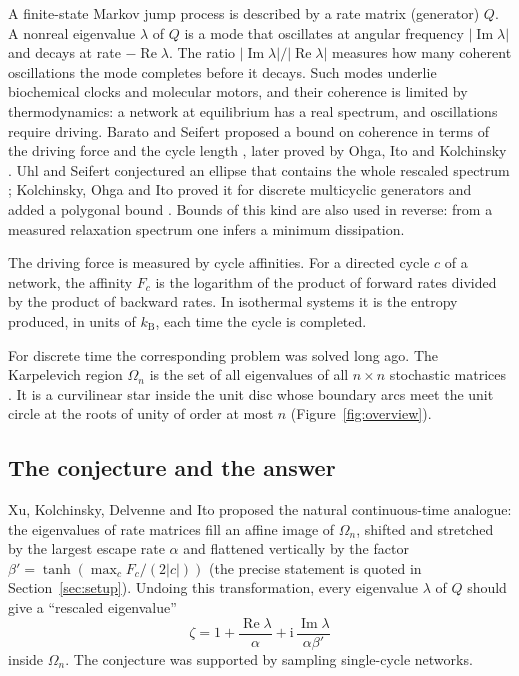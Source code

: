 \documentclass[11pt,a4paper]{article}
\numberwithin{equation}{section}
\theoremstyle{definition}
\theoremstyle{remark}
\newcommand{\ii}{\mathrm{i}}
\newcommand{\Om}{\Omega}
\begin{document}
A finite-state Markov jump process is described by a rate matrix
(generator) \(Q\). A nonreal eigenvalue \(\lambda\) of \(Q\) is a mode
that oscillates at angular frequency \(|\operatorname{Im}\lambda|\) and
decays at rate \(-\operatorname{Re}\lambda\). The ratio
\(|\operatorname{Im}\lambda|/|\operatorname{Re}\lambda|\) measures how
many coherent oscillations the mode completes before it decays. Such
modes underlie biochemical clocks and molecular motors, and their
coherence is limited by thermodynamics: a network at equilibrium has a
real spectrum, and oscillations require driving. Barato and Seifert
proposed a bound on coherence in terms of the driving force and the
cycle length \cite{barato2017}, later proved by Ohga, Ito and
Kolchinsky \cite{ohga2023}. Uhl and Seifert conjectured an ellipse that
contains the whole rescaled spectrum \cite{uhl2019}; Kolchinsky, Ohga
and Ito proved it for discrete multicyclic generators and added a
polygonal bound \cite{kolchinsky2026}. Bounds of this kind are also
used in reverse: from a measured relaxation spectrum one infers a
minimum dissipation.

The driving force is measured by cycle affinities. For a directed cycle
\(c\) of a network, the affinity \(F_c\) is the logarithm of the product
of forward rates divided by the product of backward rates. In
isothermal systems it is the entropy produced, in units of
\(k_{\mathrm B}\), each time the cycle is completed.

For discrete time the corresponding problem was solved long ago. The
Karpelevich region \(\Om_n\) is the set of all eigenvalues of all
\(n\times n\) stochastic matrices \cite{karpelevich1951,ito1997}. It is
a curvilinear star inside the unit disc whose boundary arcs meet the
unit circle at the roots of unity of order at most \(n\)
(Figure~\ref{fig:overview}).

\subsection{The conjecture and the answer}

Xu, Kolchinsky, Delvenne and Ito \cite[Supplement, Eq.~(S3)]{xu2025}
proposed the natural continuous-time analogue: the eigenvalues of rate
matrices fill an affine image of \(\Om_n\), shifted and stretched by the
largest escape rate \(\alpha\) and flattened vertically by the factor
\(\beta'=\tanh(\max_c F_c/(2|c|))\) (the precise statement is quoted
in Section~\ref{sec:setup}). Undoing this transformation, every
eigenvalue \(\lambda\) of \(Q\) should give a ``rescaled eigenvalue''
\begin{equation}
\zeta=1+\frac{\operatorname{Re}\lambda}{\alpha}
      +\ii\,\frac{\operatorname{Im}\lambda}{\alpha\beta'}
\label{eq:zeta_intro}
\end{equation}
inside \(\Om_n\). The conjecture was supported by sampling single-cycle
networks.
\end{document}
